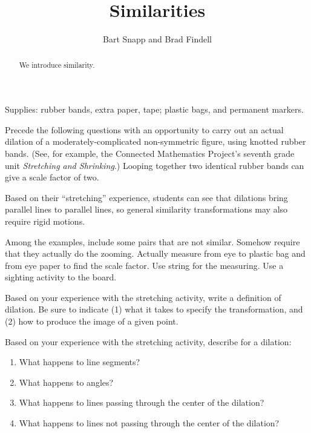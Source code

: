 \documentclass[nooutcomes,instructornotes]{ximera}
\title{Similarities}
\author{Bart Snapp and Brad Findell}
\begin{document}
\begin{abstract}
  We introduce similarity.
\end{abstract}
\maketitle

\begin{teachingnote}
Supplies:  rubber bands, extra paper, tape; plastic bags, and permanent markers.   

Precede the following questions with an opportunity to carry out an actual dilation of a moderately-complicated non-symmetric figure, using knotted rubber bands.  (See, for example, the Connected Mathematics Project's seventh grade unit \emph{Stretching and Shrinking}.)  Looping together two identical rubber bands can give a scale factor of two.

Based on their ``stretching'' experience, students can see that dilations bring parallel lines to parallel lines, so general similarity transformations may also require rigid motions.  

Among the examples, include some pairs that are not similar.  Somehow require that they actually do the zooming.  Actually measure from eye to plastic bag and from eye paper to find the scale factor.  Use string for the measuring.  Use a sighting activity to the board.
\end{teachingnote}

\begin{problem}
Based on your experience with the stretching activity, write a definition of dilation.  Be sure to indicate (1) what it takes to specify the transformation, and (2) how to produce the image of a given point.  
\vspace{0.6in}
\end{problem}

\begin{problem}
Based on your experience with the stretching activity, describe for a dilation: 
\begin{enumerate}
\item What happens to line segments? 
\vspace{0.2in}
\item What happens to angles?  
\vspace{0.2in}
\item What happens to lines passing through the center of the dilation?
\vspace{0.2in}
\item What happens to lines not passing through the center of the dilation?
\vspace{0.2in}
\end{enumerate}
\end{problem}
\end{document}
